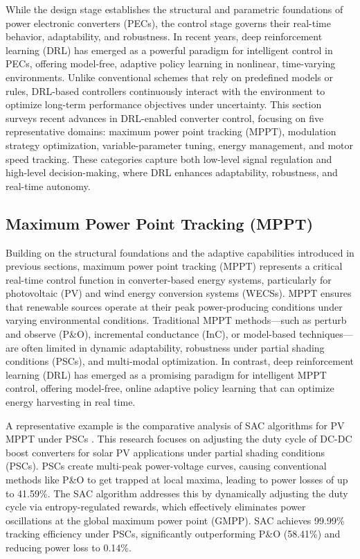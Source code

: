 While the design stage establishes the structural and parametric foundations of power electronic converters (PECs), the control stage governs their real-time behavior, adaptability, and robustness. In recent years, deep reinforcement learning (DRL) has emerged as a powerful paradigm for intelligent control in PECs, offering model-free, adaptive policy learning in nonlinear, time-varying environments. Unlike conventional schemes that rely on predefined models or rules, DRL-based controllers continuously interact with the environment to optimize long-term performance objectives under uncertainty. This section surveys recent advances in DRL-enabled converter control, focusing on five representative domains: maximum power point tracking (MPPT), modulation strategy optimization, variable-parameter tuning, energy management, and motor speed tracking. These categories capture both low-level signal regulation and high-level decision-making, where DRL enhances adaptability, robustness, and real-time autonomy.

\subsection{Maximum Power Point Tracking (MPPT)}
\label{sec:ctrl_mppt}

Building on the structural foundations and the adaptive capabilities introduced in previous sections, maximum power point tracking (MPPT) represents a critical real-time control function in converter-based energy systems, particularly for photovoltaic (PV) and wind energy conversion systems (WECSs). MPPT ensures that renewable sources operate at their peak power-producing conditions under varying environmental conditions. Traditional MPPT methods—such as perturb and observe (P\&O), incremental conductance (InC), or model-based techniques—are often limited in dynamic adaptability, robustness under partial shading conditions (PSCs), and multi-modal optimization. In contrast, deep reinforcement learning (DRL) has emerged as a promising paradigm for intelligent MPPT control, offering model-free, online adaptive policy learning that can optimize energy harvesting in real time.

A representative example is the comparative analysis of SAC algorithms for PV MPPT under PSCs \cite{nwachukwu2025comparative}. This research focuses on adjusting the duty cycle of DC-DC boost converters for solar PV applications under partial shading conditions (PSCs). PSCs create multi-peak power-voltage curves, causing conventional methods like P\&O to get trapped at local maxima, leading to power losses of up to 41.59\%. The SAC algorithm addresses this by dynamically adjusting the duty cycle via entropy-regulated rewards, which effectively eliminates power oscillations at the global maximum power point (GMPP). SAC achieves 99.99\% tracking efficiency under PSCs, significantly outperforming  P\&O (58.41\%) and reducing power loss to 0.14\%.

